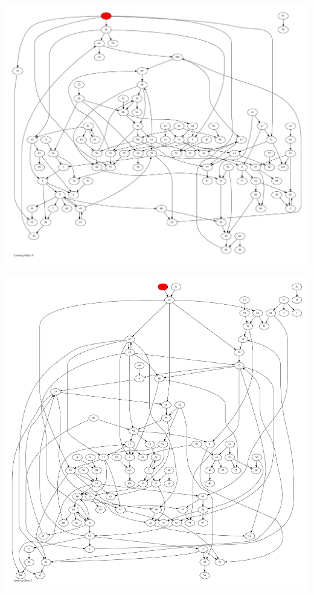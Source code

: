 \documentclass{article}
\begin{document}
\newpage
\includegraphics[max height=\textheight,max width=\textwidth]{looming_object/loom_obj8_pp.pdf}

\newpage
\includegraphics[max height=\textheight,max width=\textwidth]{looming_object/loom_obj9_pp.pdf}
\end{document}
